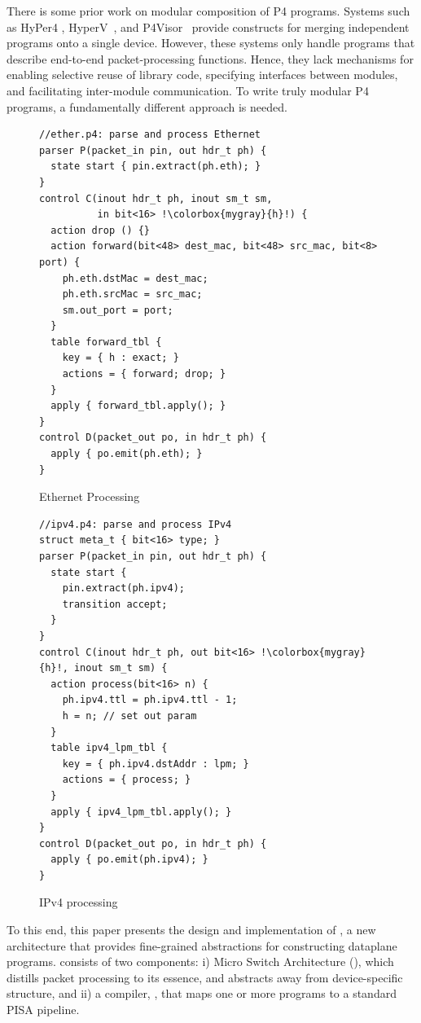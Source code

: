 \documentclass[letterpaper,twocolumn,10pt]{article}
\begin{document}
There is some prior work on modular composition of P4 programs.
Systems such as HyPer4 \cite{Hancock:2016:HUP:2999572.2999607},
HyperV~\cite{8038396}, and
P4Visor~\cite{Zheng:2018:PLV:3281411.3281436} provide constructs for
merging independent programs onto a single device. However, these
systems only handle programs that describe end-to-end
packet-processing functions. Hence, they lack mechanisms for enabling
selective reuse of library code, specifying interfaces between
modules, and facilitating inter-module communication. To write truly
modular P4 programs, a fundamentally different approach is needed.
\begin{figure}[ht]
\begin{lstlisting}[frame=none, escapechar=!]
//ether.p4: parse and process Ethernet
parser P(packet_in pin, out hdr_t ph) {
  state start { pin.extract(ph.eth); }
}
control C(inout hdr_t ph, inout sm_t sm,
          in bit<16> !\colorbox{mygray}{h}!) {
  action drop () {}
  action forward(bit<48> dest_mac, bit<48> src_mac, bit<8> port) {
    ph.eth.dstMac = dest_mac;
    ph.eth.srcMac = src_mac;
    sm.out_port = port;
  }
  table forward_tbl {
    key = { h : exact; }
    actions = { forward; drop; }
  }
  apply { forward_tbl.apply(); }
}
control D(packet_out po, in hdr_t ph) {
  apply { po.emit(ph.eth); }
}
\end{lstlisting}
\caption{Ethernet Processing}
\label{fig:ether.p4}
\end{figure}

\begin{figure}[ht]
\begin{lstlisting}[frame=none, escapechar=!]
//ipv4.p4: parse and process IPv4
struct meta_t { bit<16> type; }
parser P(packet_in pin, out hdr_t ph) {
  state start {
    pin.extract(ph.ipv4);
    transition accept;
  }
}
control C(inout hdr_t ph, out bit<16> !\colorbox{mygray}{h}!, inout sm_t sm) {
  action process(bit<16> n) {
    ph.ipv4.ttl = ph.ipv4.ttl - 1;
    h = n; // set out param
  }
  table ipv4_lpm_tbl {
    key = { ph.ipv4.dstAddr : lpm; }
    actions = { process; }
  }
  apply { ipv4_lpm_tbl.apply(); }
}
control D(packet_out po, in hdr_t ph) {
  apply { po.emit(ph.ipv4); }
}
\end{lstlisting}
\caption{IPv4 processing}
\label{fig:ipv4.p4}
\end{figure}


To this end, this paper presents the design and implementation of
\ulang, a new architecture that provides fine-grained abstractions for
constructing dataplane programs. \ulang consists of two components: i)
Micro Switch Architecture (\uarch), which distills packet processing
to its essence, and abstracts away from device-specific structure, and
ii) a compiler, \ucomp, that maps one or more \uarch programs to a
standard PISA pipeline.
\\
\end{document}
